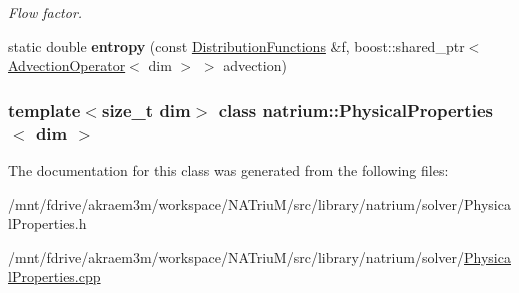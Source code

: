 \begin{DoxyCompactItemize}
\begin{DoxyCompactList}\small\item\em Flow factor. \item\end{DoxyCompactList}\item 
\hypertarget{classnatrium_1_1PhysicalProperties_ab4147a3697a7f855d640326a4bf45836}{
static double {\bfseries entropy} (const \hyperlink{classnatrium_1_1DistributionFunctions}{DistributionFunctions} \&f, boost::shared\_\-ptr$<$ \hyperlink{classnatrium_1_1AdvectionOperator}{AdvectionOperator}$<$ dim $>$ $>$ advection)}
\label{classnatrium_1_1PhysicalProperties_ab4147a3697a7f855d640326a4bf45836}

\end{DoxyCompactItemize}
\subsubsection*{template$<$size\_\-t dim$>$ class natrium::PhysicalProperties$<$ dim $>$}



The documentation for this class was generated from the following files:\begin{DoxyCompactItemize}
\item 
/mnt/fdrive/akraem3m/workspace/NATriuM/src/library/natrium/solver/PhysicalProperties.h\item 
/mnt/fdrive/akraem3m/workspace/NATriuM/src/library/natrium/solver/\hyperlink{PhysicalProperties_8cpp}{PhysicalProperties.cpp}\end{DoxyCompactItemize}
